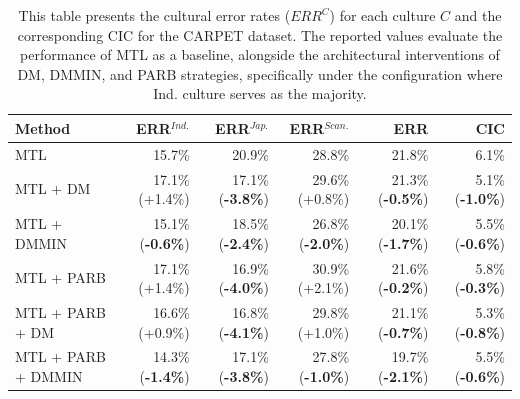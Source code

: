 \begin{table}
\centering
\scriptsize
\begin{tabular}{lrrrrr}
\toprule
\textbf{Method} & \textbf{ERR$^{Ind.}$} & \textbf{ERR$^{Jap.}$} & \textbf{ERR$^{Scan.}$} & \textbf{ERR} & \textbf{CIC} \\
\midrule
MTL  & 15.7\% & 20.9\% & 28.8\% & 21.8\% & 6.1\% \\
MTL +  DM    & 17.1\% (+1.4\%) & 17.1\% (\textbf{-3.8\%}) & 29.6\% (+0.8\%) & 21.3\% (\textbf{-0.5\%}) & 5.1\% (\textbf{-1.0\%}) \\
MTL +  DMMIN & 15.1\% (\textbf{-0.6\%}) & 18.5\% (\textbf{-2.4\%}) & 26.8\% (\textbf{-2.0\%}) & 20.1\% (\textbf{-1.7\%}) & 5.5\% (\textbf{-0.6\%}) \\
\hline
MTL + PARB     & 17.1\% (+1.4\%) & 16.9\% (\textbf{-4.0\%}) & 30.9\% (+2.1\%) & 21.6\% (\textbf{-0.2\%}) & 5.8\% (\textbf{-0.3\%}) \\
MTL + PARB + DM & 16.6\% (+0.9\%) & 16.8\% (\textbf{-4.1\%}) & 29.8\% (+1.0\%) & 21.1\% (\textbf{-0.7\%}) & 5.3\% (\textbf{-0.8\%}) \\
MTL + PARB + DMMIN & 14.3\% (\textbf{-1.4\%}) & 17.1\% (\textbf{-3.8\%}) & 27.8\% (\textbf{-1.0\%}) & 19.7\% (\textbf{-2.1\%}) & 5.5\% (\textbf{-0.6\%}) \\
\bottomrule
\end{tabular}
\caption{This table presents the cultural error rates ($ERR^C$) for each culture $C$ and the corresponding CIC for the CARPET dataset. The reported values evaluate the performance of MTL as a baseline, alongside the architectural interventions of DM, DMMIN, and PARB strategies, specifically under the configuration where Ind. culture serves as the majority.}
\label{ch3:tab:mtl_and_da:CI}
\end{table}
%
%
